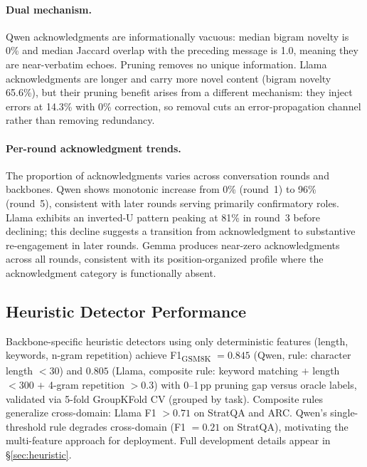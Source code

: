 \paragraph{Dual mechanism.} Qwen acknowledgments are informationally vacuous: median bigram novelty is 0\% and median Jaccard overlap with the preceding message is 1.0, meaning they are near-verbatim echoes. Pruning removes no unique information. Llama acknowledgments are longer and carry more novel content (bigram novelty 65.6\%), but their pruning benefit arises from a different mechanism: they inject errors at 14.3\% with 0\% correction, so removal cuts an error-propagation channel rather than removing redundancy.

\paragraph{Per-round acknowledgment trends.} The proportion of acknowledgments varies across conversation rounds and backbones. Qwen shows monotonic increase from 0\% (round~1) to 96\% (round~5), consistent with later rounds serving primarily confirmatory roles. Llama exhibits an inverted-U pattern peaking at 81\% in round~3 before declining; this decline suggests a transition from acknowledgment to substantive re-engagement in later rounds. Gemma produces near-zero acknowledgments across all rounds, consistent with its position-organized profile where the acknowledgment category is functionally absent.

\subsection{Heuristic Detector Performance}
\label{app:heuristic}

Backbone-specific heuristic detectors using only deterministic features (length, keywords, n-gram repetition) achieve F1\textsubscript{GSM8K} $= 0.845$ (Qwen, rule: character length $< 30$) and $0.805$ (Llama, composite rule: keyword matching $+$ length $< 300$ $+$ 4-gram repetition $> 0.3$) with 0--1\,pp pruning gap versus oracle labels, validated via 5-fold GroupKFold CV (grouped by task). Composite rules generalize cross-domain: Llama F1 $> 0.71$ on StratQA and ARC. Qwen's single-threshold rule degrades cross-domain (F1 $= 0.21$ on StratQA), motivating the multi-feature approach for deployment. Full development details appear in \S\ref{sec:heuristic}.
